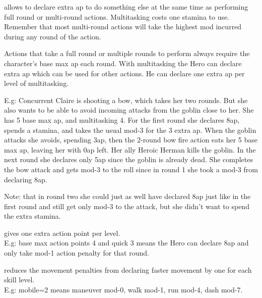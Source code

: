  allows to declare extra ap to do something else at the same time as performing full round or multi-round actions. Multitasking costs one stamina to use. Remember that most multi-round actions will take the highest mod incurred during any round of the action.

Actions that take a full round or multiple rounds to perform always require the character's base max ap each round. With multitasking the Hero can declare extra ap which can be used for other actions. He can declare one extra ap per level of multitasking.

E.g: Concurrent Claire is shooting a bow, which takes her two rounds. But she also wants to be able to avoid incoming attacks from the goblin close to her. She has 5 base max ap, and multitasking 4. For the first round she declares 8ap, spends a stamina, and takes the usual mod-3 for the 3 extra ap. When the goblin attacks she avoids, spending 3ap, then the 2-round bow fire action eats her 5 base max ap, leaving her with 0ap left. Her ally Heroic Herman kills the goblin. In the next round she declares only 5ap since the goblin is already dead. She completes the bow attack and gets mod-3 to the roll since in round 1 she took a mod-3 from declaring 8ap.

Note: that in round two she could just as well have declared 8ap just like in the first round and still get only mod-3 to the attack, but she didn't want to spend the extra stamina.


%
%
%
%


 gives one extra action point per level. \\
E.g: base max action points 4 and quick 3 means the Hero can declare 8ap and only take mod-1 action penalty for that round.


 reduces the movement penalties from declaring faster movement by one for each skill level. \\
E.g: mobile=2 means maneuver mod-0, walk mod-1, run mod-4, dash mod-7.


